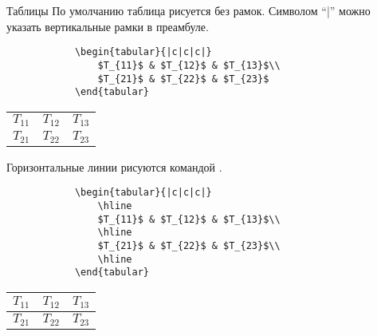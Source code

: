 \begin{frame}[fragile]{Таблицы}
	\small
	По умолчанию таблица рисуется без рамок. Символом ``|'' можно указать вертикальные рамки в преамбуле.

	\begin{minipage}{0.49\textwidth}
		\begin{verbatim}
			\begin{tabular}{|c|c|c|}
				$T_{11}$ & $T_{12}$ & $T_{13}$\\
				$T_{21}$ & $T_{22}$ & $T_{23}$ 
			\end{tabular}
		\end{verbatim}
	\end{minipage}
	\begin{minipage}{0.49\textwidth}
		\begin{center}
			\begin{tabular}{|c|c|c|}
				$T_{11}$ & $T_{12}$ & $T_{13}$\\
				$T_{21}$ & $T_{22}$ & $T_{23}$ 
			\end{tabular}
		\end{center}
	\end{minipage}
	
	Горизонтальные линии рисуются командой \texttt{\hline}.
	
	\begin{minipage}{0.49\textwidth}
		\begin{verbatim}
			\begin{tabular}{|c|c|c|}
				\hline
				$T_{11}$ & $T_{12}$ & $T_{13}$\\
				\hline
				$T_{21}$ & $T_{22}$ & $T_{23}$\\
				\hline 
			\end{tabular}
		\end{verbatim}
	\end{minipage}
	\begin{minipage}{0.49\textwidth}
		\begin{center}
			\begin{tabular}{|c|c|c|}
				\hline
				$T_{11}$ & $T_{12}$ & $T_{13}$\\
				\hline
				$T_{21}$ & $T_{22}$ & $T_{23}$\\
				\hline 
			\end{tabular}
		\end{center}
	\end{minipage}

\end{frame}

